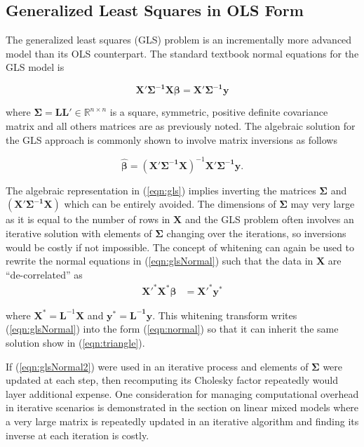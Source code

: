 \documentclass[12pt]{article}
\begin{document}
\subsection*{Generalized Least Squares in OLS Form}

The generalized least squares (GLS) problem is an incrementally more advanced model than its OLS counterpart. The standard textbook normal equations for the GLS model is

\begin{equation}
\bm{X'\Sigma^{-1}X}\bm{\beta} = \bm{X'\Sigma^{-1}y}
\label{eqn:glsNormal}
\end{equation}

\noindent where $\bm{\Sigma} = \bm{LL'} \in \mathbb{R}^{n \times n}$ is a square, symmetric, positive definite covariance matrix and all others matrices are as previously noted. The algebraic solution for the GLS approach is commonly shown to involve matrix inversions as follows

\begin{equation}
\label{eqn:gls}
\widehat{\bm{\beta}} = \bm{(X'\Sigma^{-1}X)}^{-1} \bm{X'\Sigma^{-1}y}.
\end{equation}

The algebraic representation in (\ref{eqn:gls}) implies inverting the matrices $\bm{\Sigma}$ and $\bm{(X'\Sigma^{-1}X)}$ which can be entirely avoided. The dimensions of $\bm{\Sigma}$ may very large as it is equal to the number of rows in $\bm{X}$ and the GLS problem often involves an iterative solution with elements of $\bm{\Sigma}$ changing over the iterations, so inversions would be costly if not impossible. The concept of whitening can again be used to rewrite the normal equations in (\ref{eqn:glsNormal}) such that the data in $\bm{X}$ are ``de-correlated'' as 
\begin{align}
\bm{X'^{*}X^{*}}\bm{\beta}	&= \bm{X'^{*}y^{*}}  \label{eqn:glsNormal2}
\end{align}

\noindent where $\bm{X}^{*} = \bm{L}^{-1}\bm{X}$ and $\bm{y}^* = \bm{L^{-1}}\bm{y}$. This whitening transform writes (\ref{eqn:glsNormal}) into the form (\ref{eqn:normal}) so that it can inherit the same solution show in (\ref{eqn:triangle}). 

If (\ref{eqn:glsNormal2}) were used in an iterative process and elements of $\bm{\Sigma}$ were updated at each step, then recomputing its Cholesky factor repeatedly would layer additional expense. One consideration for managing computational overhead in iterative scenarios is demonstrated in the section on linear mixed models where a very large matrix is repeatedly updated in an iterative algorithm and finding its inverse at each iteration is costly. 
\end{document}
